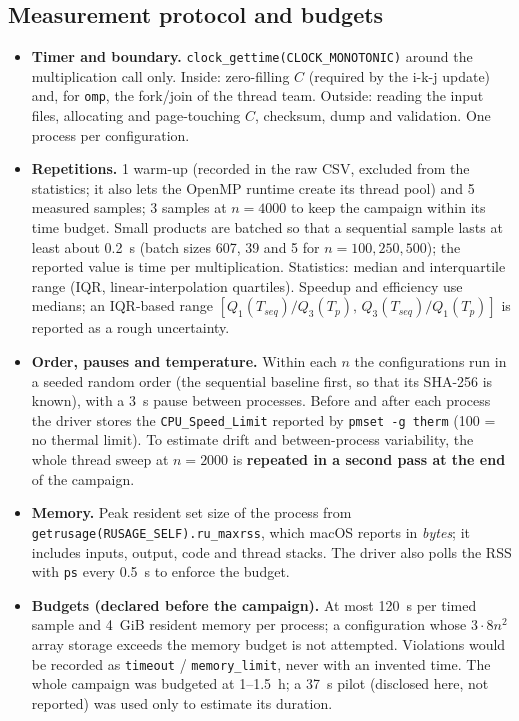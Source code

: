 \subsection{Measurement protocol and budgets}
\begin{itemize}
\item \textbf{Timer and boundary.} \texttt{clock\_gettime(CLOCK\_MONOTONIC)} around the multiplication call only. Inside: zero-filling
$C$ (required by the i-k-j update) and, for \texttt{omp}, the fork/join of the thread team. Outside: reading the input files, allocating
and page-touching $C$, checksum, dump and validation. One process per configuration.
\item \textbf{Repetitions.} 1 warm-up (recorded in the raw CSV, excluded from the statistics; it also lets the OpenMP runtime create its
thread pool) and 5 measured samples; 3 samples at $n=4000$ to keep the campaign within its time budget. Small products are batched so
that a sequential sample lasts at least about 0.2~s (batch sizes 607, 39 and 5 for $n=100,250,500$); the reported value is time per
multiplication. Statistics: median and interquartile range (IQR, linear-interpolation quartiles). Speedup and efficiency use medians;
an IQR-based range $[Q_1(T_{seq})/Q_3(T_p),\,Q_3(T_{seq})/Q_1(T_p)]$ is reported as a rough uncertainty.
\item \textbf{Order, pauses and temperature.} Within each $n$ the configurations run in a seeded random order (the sequential baseline first,
so that its SHA-256 is known), with a 3~s pause between processes. Before and after each process the driver stores the
\texttt{CPU\_Speed\_Limit} reported by \texttt{pmset -g therm} (100 = no thermal limit). To estimate drift and between-process variability,
the whole thread sweep at $n=2000$ is \textbf{repeated in a second pass at the end} of the campaign.
\item \textbf{Memory.} Peak resident set size of the process from \texttt{getrusage(RUSAGE\_SELF).ru\_maxrss}, which macOS reports in
\emph{bytes}; it includes inputs, output, code and thread stacks. The driver also polls the RSS with \texttt{ps} every 0.5~s to enforce the budget.
\item \textbf{Budgets (declared before the campaign).} At most 120~s per timed sample and 4~GiB resident memory per process; a configuration
whose $3\cdot8n^2$ array storage exceeds the memory budget is not attempted. Violations would be recorded as \texttt{timeout} /
\texttt{memory\_limit}, never with an invented time. The whole campaign was budgeted at 1--1.5~h; a 37~s pilot (disclosed here, not
reported) was used only to estimate its duration.
\end{itemize}


